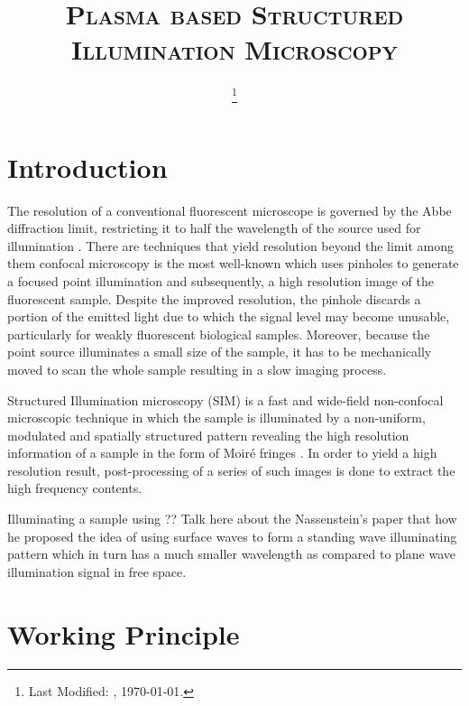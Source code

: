 \documentclass[11pt]{article}
\begin{document}
\title{\textsc{Plasma based Structured Illumination Microscopy}\\}
\date{\footnote{Last Modified: \currenttime, \today.}}
\maketitle

\section{Introduction}


The resolution of a conventional fluorescent microscope is governed by the Abbe diffraction limit, restricting it to half the wavelength of the source used for illumination \cite{0521639212}. There are techniques that yield resolution beyond the limit among them confocal microscopy is the most well-known which uses pinholes to generate a focused point illumination and subsequently, a high resolution image of the fluorescent sample. Despite the improved resolution, the pinhole discards a portion of the emitted light due to which the signal level may become unusable, particularly for weakly fluorescent biological samples. Moreover, because the point source illuminates a small size of the sample, it has to be mechanically moved to scan the whole sample resulting in a slow imaging process.

Structured Illumination microscopy (SIM) is a fast and wide-field non-confocal microscopic technique in which the sample is illuminated by a non-uniform, modulated and spatially structured pattern revealing the high resolution information of a sample in the form of Moiré fringes \cite{Gustafsson_2000,Heintzmann1999a}. In order to yield a high resolution result, post-processing of a series of such images is done to extract the high frequency contents.

Illuminating a sample using
?? Talk here about the Nassenstein's paper that how he proposed the idea of using surface waves to form a standing wave illuminating pattern which in turn has a much smaller wavelength as compared to plane wave illumination signal in free space.

\section{Working Principle}
\end{document}
